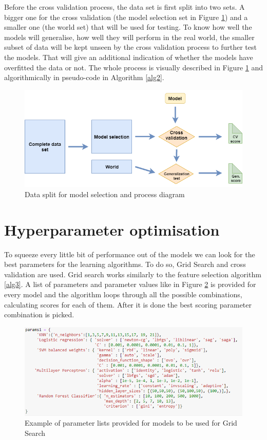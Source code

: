 Before the cross validation process, the data set is first split into two sets. A bigger one for the cross validation (the model selection set in Figure \ref{fig:modelsel}) and a smaller one (the world set) that will be used for testing. To know how well the models will generalise, how well they will perform in the real world, the smaller subset of data will be kept unseen by the cross validation process to further test the models. That will give an additional indication of whether the models have overfitted the data or not. The whole process is visually described in Figure \ref{fig:modelsel} and algorithmically in pseudo-code in Algorithm \ref{alg2}.

\begin{figure}[h]
\centering
\includegraphics[width=0.9\linewidth]{methodology/fig/process.png}
\caption{Data split for model selection and process diagram \cite{CrossValVimeo:online}}
\label{fig:modelsel}
\end{figure}



\section{Hyperparameter optimisation}

To squeeze every little bit of performance out of the models we can look for the best parameters for the learning algorithms. To do so, Grid Search and cross validation are used. Grid search works similarly to the feature selection algorithm \ref{alg3}. A list of parameters and parameter values like in Figure \ref{fig:hyper} is provided for every model and the algorithm loops through all the possible combinations, calculating scores for each of them. After it is done the best scoring parameter combination is picked.

\begin{figure}[h]
\centering
\includegraphics[width=0.9\linewidth]{methodology/fig/hyper.png}
\caption{Example of parameter lists provided for models to be used for Grid Search}
\label{fig:hyper}
\end{figure}

